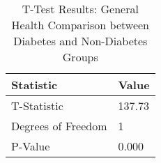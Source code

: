 
\begin{table}[h!]
\centering
\begin{tabular}{|l|l|}
\hline
\textbf{Statistic}       & \textbf{Value} \\ \hline
T-Statistic                & 137.73     \\ \hline
Degrees of Freedom          & 1          \\ \hline
P-Value                    & 0.000      \\ \hline
\end{tabular}

\vspace{0.5cm} %

\caption{T-Test Results: General Health Comparison between Diabetes and Non-Diabetes Groups}
\label{tab:t_test_general_health_results}
\end{table}
